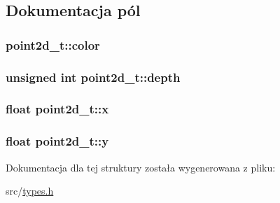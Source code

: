 \subsection{Dokumentacja pól}
\hypertarget{structpoint2d__t_adab609377d70a908d71cc3475eb4c88f}{
\subsubsection[{color}]{ point2d\-\_\-t\-::color}}\label{structpoint2d__t_adab609377d70a908d71cc3475eb4c88f}
\hypertarget{structpoint2d__t_af0fd7ab7c8722d88a2fd64c2dd41e5e5}{
\subsubsection[{depth}]{\setlength{\rightskip}{0pt plus 5cm}unsigned int point2d\-\_\-t\-::depth}}\label{structpoint2d__t_af0fd7ab7c8722d88a2fd64c2dd41e5e5}
\hypertarget{structpoint2d__t_a6b52fbe1db413e6273a6e33c23158c2d}{
\subsubsection[{x}]{\setlength{\rightskip}{0pt plus 5cm}float point2d\-\_\-t\-::x}}\label{structpoint2d__t_a6b52fbe1db413e6273a6e33c23158c2d}
\hypertarget{structpoint2d__t_acd589ab17f5cb77d50230c6246a1c671}{
\subsubsection[{y}]{\setlength{\rightskip}{0pt plus 5cm}float point2d\-\_\-t\-::y}}\label{structpoint2d__t_acd589ab17f5cb77d50230c6246a1c671}


Dokumentacja dla tej struktury została wygenerowana z pliku\-:\begin{DoxyCompactItemize}
\item 
src/\hyperlink{types_8h}{types.\-h}\end{DoxyCompactItemize}
